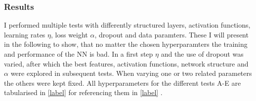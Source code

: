 \documentclass[11pt,a4paper]{article}
\begin{document}
\subsubsection{Results}
I performed multiple tests with differently structured layers, activation functions, learning rates $\eta$, loss weight $\alpha$, dropout and data paramters. 
These I will present in the following to show, that no matter the chosen hyperparamters the training and performance of the NN is bad. 
In a first step $\eta$ and the use of dropout was varied, after which the best features, activation functions, network structure and $\alpha$ were explored in subsequent tests. 
When varying one or two related parameters the others were kept fixed. 
All hyperparameters for the different tests A-E are tabularised in \autoref{label} for referencing them in \autoref{label} . 
\end{document}
